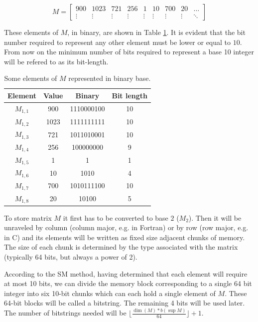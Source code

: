 \documentclass[10pt]{article}
\begin{document}
\begin{equation} \label{eq:02}
  M = \begin{bmatrix}
  900 & 1023 & 721 & 256 & 1 & 10 & 700 & 20 & \hdots\\ 
  \vdots & \vdots & \vdots & \vdots & \vdots & \vdots & \vdots & \vdots & \ddots 
  \end{bmatrix}
\end{equation}

These elements of $M$, in binary, are shown in Table \ref{tab:01}. It is evident that the bit number required to represent any other element must be lower or equal to $10$. From now on the minimum number of bits required to represent a base 10 integer will be refered to as its bit-length.

\begin{table}[h]
 \centering
 \caption{Some elements of $M$ represented in binary base.}
 \begin{tabular}{cccc} 
  \hline 
  Element & Value  & Binary & Bit length\\
  \hline
  $M_{1,1}$ & 900  & 1110000100 & 10\\
  $M_{1,2}$ & 1023 & 1111111111 & 10\\
  $M_{1,3}$ & 721  & 1011010001 & 10\\
  $M_{1,4}$ & 256  & 100000000  & 9\\
  $M_{1,5}$ & 1    & 1          & 1\\
  $M_{1,6}$ & 10   & 1010       & 4\\
  $M_{1,7}$ & 700  & 1010111100 & 10\\
  $M_{1,8}$ & 20   & 10100      & 5\\
  \hline
 \end{tabular}
 \label{tab:01}
\end{table}

To store matrix $M$ it first has to be converted to base $2$ ($M_2$). Then it will be unraveled by column (column major, e.g. in Fortran) or by row (row major, e.g. in C) and its elements will be written as  fixed size adjacent chunks of memory. The size of each chunk is determined by the type associated with the matrix (typically 64 bits, but always a power of 2).

According to the SM method, having determined that each element will require at most 10 bits, we can divide the memory block corresponding to a single 64 bit integer into six 10-bit chunks which can each hold a single element of $M$. These 64-bit blocks will be called a bitstring. The remaining 4 bits will be used later. The number of bitstrings needed will be $\lfloor \frac{\dim(M) *b(\sup M)} {64} \rfloor +1$.
\end{document}
